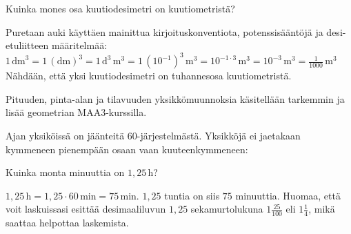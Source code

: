 \begin{esimerkki}
Kuinka mones osa kuutiodesimetri on kuutiometristä?

	\begin{esimratk}
	Puretaan auki käyttäen mainittua kirjoituskonventiota, potenssisääntöjä ja desi-etuliitteen määritelmää:
	$1\,\text{dm}^3=1\,(\text{dm})^3=1\,\text{d}^3\,\text{m}^3=1\,(10^{-1})^3\,\text{m}^3=10^{-1\cdot3}\,\text{m}^3=10^{-3}\,\text{m}^3=\frac{1}{1000}\,\text{m}^3$
	Nähdään, että yksi kuutiodesimetri on tuhannesosa kuutiometristä.
	\end{esimratk}

\end{esimerkki}







Pituuden, pinta-alan ja tilavuuden yksikkömuunnoksia käsitellään tarkemmin ja lisää geometrian MAA3-kurssilla. 

Ajan yksiköissä on jäänteitä $60$-järjestelmästä. Yksikköjä ei jaetakaan kymmeneen pienempään osaan vaan kuuteenkymmeneen:


%
%
%
%

\begin{esimerkki}
Kuinka monta minuuttia on $1,25$\,h?

\begin{esimratk}
$1,25\,\text{h} = 1,25 \cdot 60\,\text{min} = 75\,\text{min}$. $1,25$ tuntia on siis $75$ minuuttia. Huomaa, että voit laskuissasi esittää desimaaliluvun $1,25$ sekamurtolukuna $1\frac{25}{100}$ eli $1\frac{1}{4}$, mikä saattaa helpottaa laskemista.
\end{esimratk}
\end{esimerkki}

